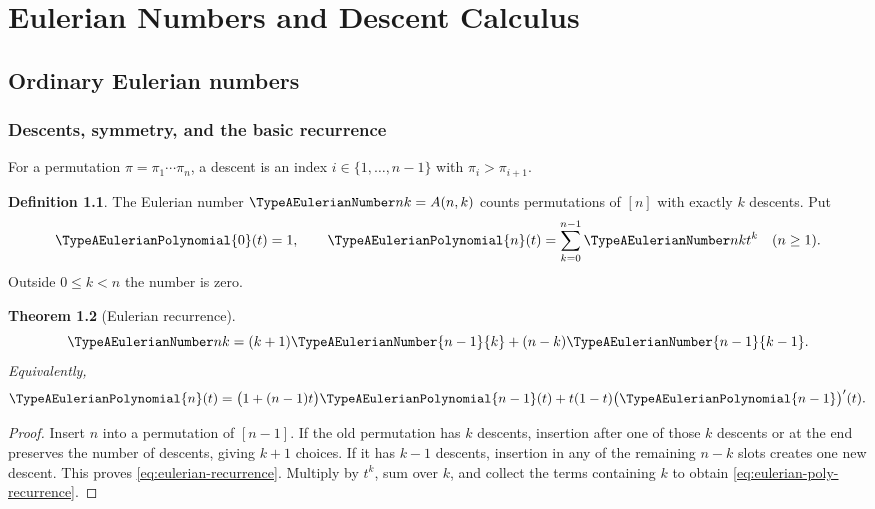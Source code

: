 \documentclass[11pt,a4paper,oneside,openany]{book}
\newtheorem{theorem}{Theorem}[chapter]
\theoremstyle{definition}
\newtheorem{definition}[theorem]{Definition}
\theoremstyle{remark}
\begin{document}
\part{Eulerian Numbers and Descent Calculus}

\chapter{Ordinary Eulerian numbers}

\section{Descents, symmetry, and the basic recurrence}
For a permutation $\pi=\pi_1\cdots\pi_n$, a descent is an index
$i\in\{1,\ldots,n-1\}$ with $\pi_i>\pi_{i+1}$.
\begin{definition}
The Eulerian number $\TypeAEulerianNumber nk=A(n,k)$ counts permutations of $[n]$ with
exactly $k$ descents.  Put
\[
 \TypeAEulerianPolynomial{0}(t)=1,
 \qquad
 \TypeAEulerianPolynomial{n}(t)=\sum_{k=0}^{n-1}\TypeAEulerianNumber nk t^k\quad(n\ge1).
\]
Outside $0\le k<n$ the number is zero.
\end{definition}

\begin{theorem}[Eulerian recurrence]\label{thm:eulerian-recurrence}
\begin{equation}\label{eq:eulerian-recurrence}
 \TypeAEulerianNumber nk=(k+1)\TypeAEulerianNumber{n-1}{k}
 +(n-k)\TypeAEulerianNumber{n-1}{k-1}.
\end{equation}
Equivalently,
\begin{equation}\label{eq:eulerian-poly-recurrence}
 \TypeAEulerianPolynomial{n}(t)=\bigl(1+(n-1)t\bigr)\TypeAEulerianPolynomial{n-1}(t)
       +t(1-t)\bigl(\TypeAEulerianPolynomial{n-1}\bigr)'(t).
\end{equation}
\end{theorem}
\begin{proof}
Insert $n$ into a permutation of $[n-1]$.  If the old permutation has $k$
descents, insertion after one of those $k$ descents or at the end preserves the
number of descents, giving $k+1$ choices.  If it has $k-1$ descents, insertion in
any of the remaining $n-k$ slots creates one new descent.  This proves
\eqref{eq:eulerian-recurrence}.  Multiply by $t^k$, sum over $k$, and collect the
terms containing $k$ to obtain \eqref{eq:eulerian-poly-recurrence}.
\end{proof}
\end{document}
